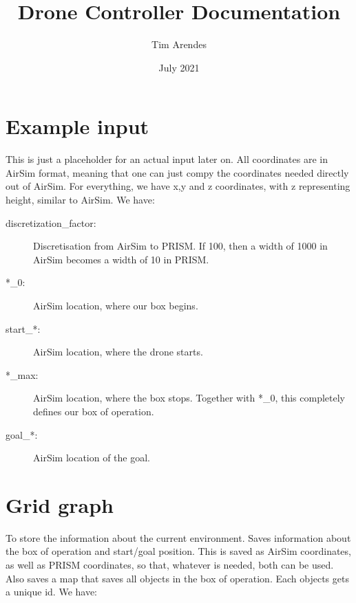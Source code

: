 \documentclass{article}
\title{Drone Controller Documentation}
\author{Tim Arendes}
\date{July 2021}
\begin{document}
\maketitle


\section{Example input}
This is just a placeholder for an actual input later on. All coordinates are in AirSim format, meaning that one can just compy the coordinates needed directly out of AirSim. For everything, we have x,y and z coordinates, with z representing height, similar to AirSim. We have:\\

\begin{description}
    \item[discretization\_factor:] Discretisation from AirSim to PRISM. If 100, then a width of 1000 in AirSim becomes a width of 10 in PRISM.
    \item[*\_0:] AirSim location, where our box begins.
    \item[start\_*:] AirSim location, where the drone starts.
    \item[*\_max:] AirSim location, where the box stops. Together with *\_0, this completely defines our box of operation.
    \item[goal\_*:] AirSim location of the goal.
\end{description}

\section{Grid graph}
To store the information about the current environment. Saves information about the box of operation and start/goal position. This is saved as AirSim coordinates, as well as PRISM coordinates, so that, whatever is needed, both can be used.
Also saves a map that saves all objects in the box of operation. Each objects gets a unique id. We have:\\
\end{document}
